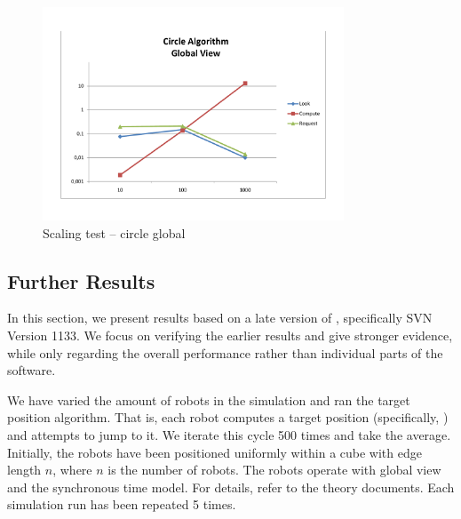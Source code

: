 \begin{figure}[p]
	\begin{center}
	\includegraphics[width=0.8\textwidth]{scaling-circle-global}
	\caption{Scaling test -- circle global}
	\label{pic:scaling:circleglobal}
	\end{center}
\end{figure}

\subsection{Further Results}
In this section, we present results based on a late version of \RSS, specifically SVN Version 1133. We focus on verifying the earlier results and give stronger evidence, while only regarding the overall performance rather than individual parts of the software.

We have varied the amount of robots in the simulation and ran the target position algorithm. That is, each robot computes a target position (specifically, ) and attempts to jump to it. We iterate this \LCM cycle 500 times and take the average. Initially, the robots have been positioned uniformly within a cube with edge length $n$, where $n$ is the number of robots. The robots operate with global view and the synchronous time model. For details, refer to the theory documents. Each simulation run has been repeated 5 times.

